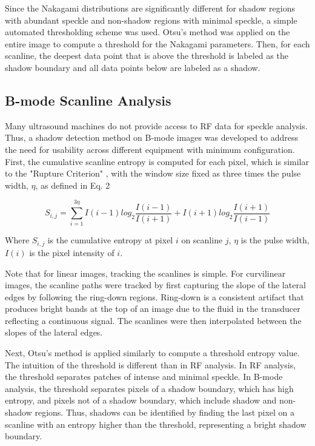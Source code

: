 \documentclass[preprint,5p,authoryear]{elsarticle}
\begin{document}
Since the Nakagami distributions are significantly different for shadow regions with abundant speckle and non-shadow regions with minimal speckle, a simple automated thresholding scheme was used. Otsu's method was applied on the entire image to compute a threshold for the Nakagami parameters. Then, for each scanline, the deepest data point that is above the threshold is labeled as the shadow boundary and all data points below are labeled as a shadow.

\subsection*{B-mode Scanline Analysis}

Many ultrasound machines do not provide access to RF data  for speckle analysis. Thus, a shadow detection method on B-mode images was developed to address the need for usability across different equipment with minimum configuration. First, the cumulative scanline entropy is computed for each pixel, which is similar to the "Rupture Criterion" \citep{Hellier2010}, with the window size fixed as three times the pulse width, $\eta$, as defined in Eq. 2

\begin{equation}
S_{i,j} = \sum_{i=1}^{3\eta}I(i-1)log_{2}\frac{I(i-1)}{I(i+1)}+I(i+1)log_{2}\frac{I(i+1)}{I(i-1)}
\end{equation}

Where $S_{i,j}$ is the cumulative entropy at pixel $i$ on scanline $j$, $\eta$ is the pulse width, $I(i)$ is the pixel intensity of $i$.

Note that for linear images, tracking the scanlines is simple. For curvilinear images, the scanline paths were tracked by first capturing the slope of the lateral edges by following the ring-down regions. Ring-down is a consistent artifact that produces bright bands at the top of an image due to the fluid in the transducer reflecting a continuous signal. The scanlines were then interpolated between the slopes of the lateral edges.

Next, Otsu's method is applied similarly to compute a threshold entropy value. The intuition of the threshold is different than in RF analysis. In RF analysis, the threshold separates patches of intense and minimal speckle. In B-mode analysis, the threshold separates pixels of a shadow boundary, which has high entropy, and pixels not of a shadow boundary, which include shadow and non-shadow regions. Thus, shadows can be identified by finding the last pixel on a scanline with an entropy higher than the threshold, representing a bright shadow boundary.
\end{document}
